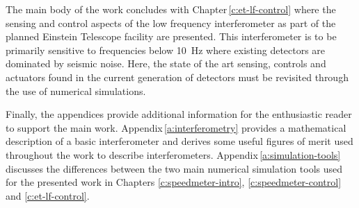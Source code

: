 The main body of the work concludes with Chapter\,\ref{c:et-lf-control} where the sensing and control aspects of the low frequency interferometer as part of the planned Einstein Telescope facility are presented. This interferometer is to be primarily sensitive to frequencies below \SI{10}{\hertz} where existing detectors are dominated by seismic noise. Here, the state of the art sensing, controls and actuators found in the current generation of detectors must be revisited through the use of numerical simulations.

Finally, the appendices provide additional information for the enthusiastic reader to support the main work. Appendix\,\ref{a:interferometry} provides a mathematical description of a basic interferometer and derives some useful figures of merit used throughout the work to describe interferometers. Appendix\,\ref{a:simulation-tools} discusses the differences between the two main numerical simulation tools used for the presented work in Chapters \ref{c:speedmeter-intro}, \ref{c:speedmeter-control} and \ref{c:et-lf-control}.